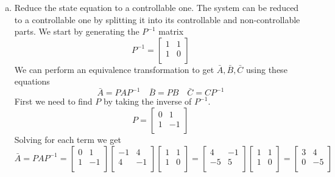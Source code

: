 \documentclass{article}
\begin{document}
\begin{enumerate}[a.]
\item Reduce the state equation to a controllable one.
\newline
The system can be reduced to a controllable one by splitting it into its controllable and non-controllable parts.
We start by generating the $P^{-1}$ matrix
$$
P^{-1} =
\begin{bmatrix}
1 & 1 \\
1 & 0 \\
\end{bmatrix}
$$
We can perform an equivalence transformation to get $\bar{A}, \bar{B}, \bar{C}$ using these equations
$$ \bar{A} = PAP^{-1} \quad \bar{B} = PB \quad \bar{C} = CP^{-1} $$
First we need to find $P$ by taking the inverse of $P^{-1}$.
$$
P =
\begin{bmatrix}
0 & 1 \\
1 & -1 \\
\end{bmatrix}
$$
Solving for each term we get
$$
\bar{A} = PAP^{-1} =
\begin{bmatrix}
0 & 1 \\
1 & -1 \\
\end{bmatrix}
\begin{bmatrix}
-1 &  4 \\
 4 & -1 \\
\end{bmatrix}
\begin{bmatrix}
1 & 1 \\
1 & 0 \\
\end{bmatrix}
=
\begin{bmatrix}
 4 & -1 \\
-5 &  5 \\
\end{bmatrix}
\begin{bmatrix}
1 & 1 \\
1 & 0 \\
\end{bmatrix}
=
\begin{bmatrix}
 3 &  4 \\
 0 & -5 \\
\end{bmatrix}
$$


\end{enumerate}
\end{document}
